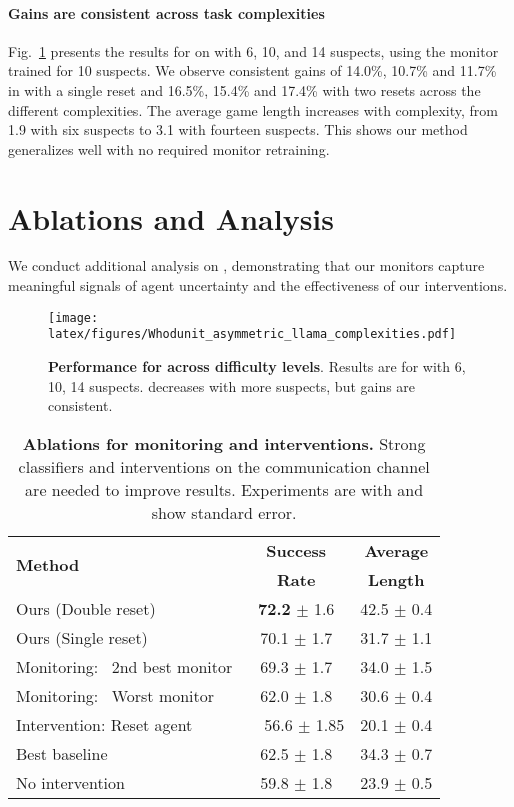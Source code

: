 \paragraph{Gains are consistent across task complexities}
Fig.~\ref{fig:complexity} presents the results for \llama{} on \ourenvasym{} with 6, 10, and 14 suspects, using the monitor trained for 10 suspects.
We observe consistent gains of 14.0\%, 10.7\% and 11.7\% in \success{} with a single reset and 16.5\%, 15.4\% and 17.4\% with two resets across the different complexities. The average game length increases with complexity, from 1.9 with six suspects to 3.1 with fourteen suspects.
This shows our method generalizes well with no required monitor retraining.

\section{Ablations and Analysis}
\label{sec:analysis}

We conduct additional analysis on \ourenvasym{}, demonstrating that our monitors capture meaningful signals of agent uncertainty and the effectiveness of our interventions.

\begin{figure}[t]
  \texttt{[image: latex/figures/Whodunit\_asymmetric\_llama\_complexities.pdf]}
  \caption{\textbf{Performance for \ourenvsym{} across difficulty levels}. Results are for \llama{} with 6, 10, 14 suspects. \success{} decreases with more suspects, but gains are consistent.}
  \label{fig:complexity}
\end{figure}


\begin{table}[t]
\centering
\setlength\tabcolsep{3.8pt}
\footnotesize
  \begin{tabular}{lcc}
    \toprule
    \multirow{2}{*}{\textbf{Method}} & \textbf{Success} &\textbf{Average} \\ 
    & \textbf{Rate} & \textbf{Length}\\ 
    \midrule
        Ours (Double reset) & \textbf{72.2} $\pm$ 1.6 & 42.5 $\pm$ 0.4\\ 
    Ours (Single reset) & 70.1 $\pm$ 1.7 & 31.7 $\pm$ 1.1 \\ 
    \midrule
    Monitoring: ~2nd best monitor & 69.3 $\pm$ 1.7 & 34.0 $\pm$ 1.5\\ 
    Monitoring: ~Worst monitor & 62.0 $\pm$ 1.8 & 30.6 $\pm$ 0.4 \\ 
    Intervention: Reset agent & ~~56.6 $\pm$ 1.85 & 20.1 $\pm$ 0.4\\ \midrule 
    Best baseline & 62.5 $\pm$ 1.8 & 34.3 $\pm$ 0.7\\
    No intervention & 59.8 $\pm$ 1.8 & 23.9 $\pm$ 0.5 \\

    \bottomrule
  \end{tabular}
  \caption{\textbf{Ablations for monitoring and interventions.} Strong classifiers and interventions on the communication channel are needed to improve results. Experiments are with \qwen{} and show standard error.}
  \label{tab:ablations}
\end{table}


